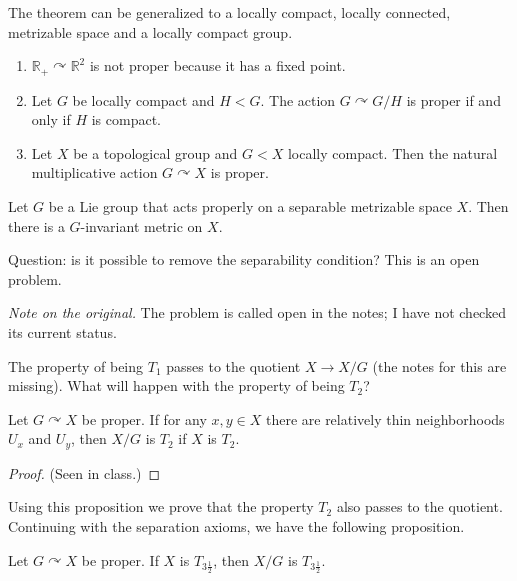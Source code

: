\begin{remark}
\label{remark-van-dantzig-general}
The theorem can be generalized to a
locally compact, locally connected,
metrizable space and a locally compact
group.
\end{remark}

\begin{example}
\label{example-proper-actions}
\begin{enumerate}
\item $\mathbb{R}_+
\curvearrowright\mathbb{R}^2$ is not
proper because it has a fixed point.
\item Let $G$ be locally compact and
$H<G$. The action
$G\curvearrowright G/H$ is proper if
and only if $H$ is compact.
\item Let $X$ be a topological group
and $G<X$ locally compact. Then the
natural multiplicative action
$G\curvearrowright X$ is proper.
\end{enumerate}
\end{example}

\begin{theorem}[R. Palais, 1961]
\label{theorem-palais-invariant-metric}
Let $G$ be a Lie group that acts
properly on a separable metrizable
space $X$. Then there is a
$G$-invariant metric on $X$.
\end{theorem}

\begin{remark}
\label{remark-question-separability}
Question: is it possible to remove the
separability condition? This is an open
problem.
\end{remark}

\noindent
{\it Note on the original.} The problem
is called open in the notes; I have not
checked its current status.

The property of being $T_1$ passes to
the quotient $X\to X/G$ (the notes for
this are missing). What will happen
with the property of being $T_2$?

\begin{proposition}
\label{proposition-proper-hausdorff-quotient}
Let $G\curvearrowright X$ be proper. If
for any $x,y\in X$ there are relatively
thin neighborhoods $U_x$ and $U_y$,
then $X/G$ is $T_2$ if $X$ is $T_2$.
\end{proposition}

\begin{proof}
(Seen in class.)
\end{proof}

Using this proposition we prove that
the property $T_2$ also passes to the
quotient. Continuing with the
separation axioms, we have the
following proposition.

\begin{proposition}
\label{proposition-proper-tychonoff-quotient}
Let $G\curvearrowright X$ be proper. If
$X$ is $T_{3\frac{1}{2}}$, then $X/G$
is $T_{3\frac{1}{2}}$.
\end{proposition}





